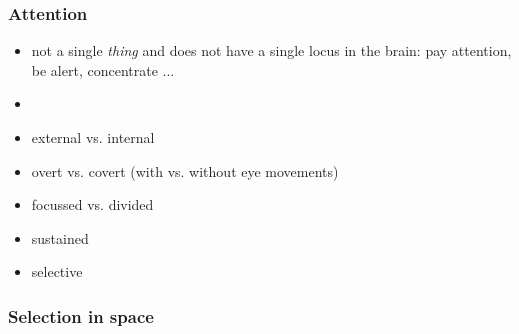 \documentclass[]{beamer}
\begin{document}
\begin{frame}
\frametitle{Attention}
\begin{overlayarea}{110mm}{80mm}
\begin{itemize}
 \item<1-> not a single \textit{thing} and does not have a single locus in the brain: pay attention, be alert, concentrate ...
 \item[]
 \item<2-> external vs. internal
 \item<3-> overt vs. covert (with vs. without eye movements)
 \item<4-> focussed vs. divided
 \item<5-> sustained
 \item<6-> selective
\end{itemize}
\end{overlayarea}
\end{frame}


\begin{frame}
 \frametitle{Selection in space}
\begin{overlayarea}{130mm}{75mm}

\end{overlayarea}
\end{frame}
\end{document}
